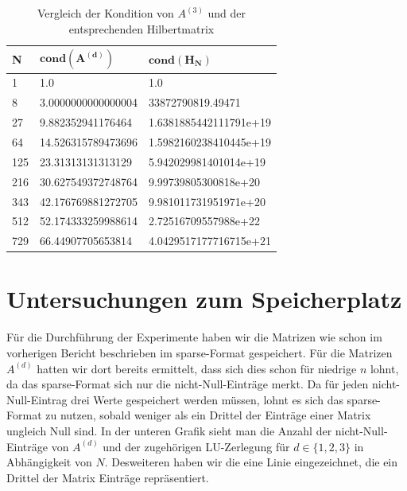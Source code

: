 \documentclass{scrartcl}
\begin{document}
\begin{table}[ht!]
\centering
\begin{tabular}{|l|l|l|}
\hline
\textbf{N} & $\mathbf{cond(A^{(d)})}$ & $\mathbf{cond(H_N)}$       \\ \hline
1          & 1.0                       & 1.0                    \\ \hline
8          & 3.0000000000000004        & 33872790819.49471      \\ \hline
27         & 9.882352941176464         & 1.6381885442111791e+19 \\ \hline
64         & 14.526315789473696        & 1.5982160238410445e+19 \\ \hline
125        & 23.31313131313129         & 5.942029981401014e+19  \\ \hline
216        & 30.627549372748764        & 9.99739805300818e+20   \\ \hline
343        & 42.176769881272705        & 9.981011731951971e+20  \\ \hline
512        & 52.174333259988614        & 2.72516709557988e+22   \\ \hline
729        & 66.44907705653814         & 4.0429517177716715e+21 \\ \hline
\end{tabular}
\caption{Vergleich der Kondition von $A^{(3)}$ und der entsprechenden Hilbertmatrix}
\end{table}

\pagebreak
\section{Untersuchungen zum Speicherplatz}
Für die Durchführung der Experimente haben wir die Matrizen wie schon im vorherigen Bericht beschrieben im sparse-Format gespeichert.
Für die Matrizen $A^{(d)}$ hatten wir dort bereits ermittelt, dass sich dies schon für niedrige $n$ lohnt, da das sparse-Format sich nur die nicht-Null-Einträge merkt.
Da für jeden nicht-Null-Eintrag drei Werte gespeichert werden müssen, lohnt es sich das sparse-Format zu nutzen, sobald weniger als ein Drittel der Einträge einer Matrix ungleich Null sind.
In der unteren Grafik sieht man die Anzahl der nicht-Null-Einträge von $A^{(d)}$ und der zugehörigen LU-Zerlegung für $d\in\{1, 2, 3\}$ in Abhängigkeit von $N$.
Desweiteren haben wir die eine Linie eingezeichnet, die ein Drittel der Matrix Einträge repräsentiert.
\end{document}
